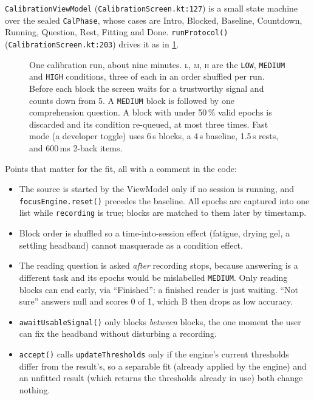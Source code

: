 \documentclass[10pt,a4paper]{article}
\newcommand{\file}[1]{\texttt{\small #1}}          %
\newcommand{\code}[1]{\texttt{#1}}                  %
\begin{document}
\code{CalibrationViewModel} (\file{CalibrationScreen.kt:127}) is a small state machine over the
sealed \code{CalPhase}, whose cases are Intro, Blocked, Baseline, Countdown, Running, Question,
Rest, Fitting and Done. \code{runProtocol()}
(\file{CalibrationScreen.kt:203}) drives it as in \cref{fig:protocol}.

\begin{figure}[htbp]\centering
{}
\caption{One calibration run, about nine minutes. \textsc{l}, \textsc{m}, \textsc{h} are the
\code{LOW}, \code{MEDIUM} and \code{HIGH} conditions, three of each in an order shuffled per run.
Before each block the screen waits for a trustworthy signal and counts down from 5. A \code{MEDIUM}
block is followed by one comprehension question. A block with under 50\,\% valid epochs is discarded
and its condition re-queued, at most three times. Fast mode (a developer toggle) uses 6\,s blocks,
a 4\,s baseline, 1.5\,s rests, and 600\,ms 2-back items.}\label{fig:protocol}
\end{figure}

Points that matter for the fit, all with a comment in the code:
\begin{itemize}
\item The source is started by the ViewModel only if no session is running, and
  \code{focusEngine.reset()} precedes the baseline. All epochs are captured into one list while
  \code{recording} is true; blocks are matched to them later by timestamp.
\item Block order is shuffled so a time-into-session effect (fatigue, drying gel, a settling
  headband) cannot masquerade as a condition effect.
\item The reading question is asked \emph{after} recording stops, because answering is a different
  task and its epochs would be mislabelled \code{MEDIUM}. Only reading blocks can end early, via
  ``Finished'': a finished reader is just waiting. ``Not sure'' answers null and scores 0 of 1,
  which B then drops as low accuracy.
\item \code{awaitUsableSignal()} only blocks \emph{between} blocks, the one moment the user can fix
  the headband without disturbing a recording.
\item \code{accept()} calls \code{updateThresholds} only if the engine's current thresholds differ
  from the result's, so a separable fit (already applied by the engine) and an unfitted result
  (which returns the thresholds already in use) both change nothing.
\end{itemize}
\end{document}
